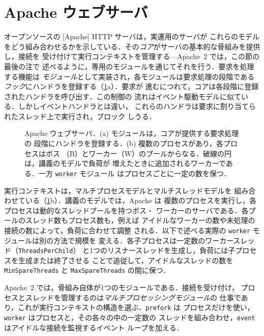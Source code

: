 \documentclass[../main.tex]{subfiles}
\begin{document}
\section{Apache ウェブサーバ}
\label{sec:l06-apache}

オープンソースの [Apache] HTTP サーバは，実運用のサーバが
これらのモデルをどう組み合わせるかを示している．その\emph{コア}がサーバの基本的な骨組みを提供し，接続を
受け付けて実行コンテキストを管理する---Apache~2 では，この節の最後の注で
述べるように，専用のモジュールを通じてそれを行う．要求を処理する機能は
\emph{モジュール}として実装され，各モジュールは要求処理の段階である
\emph{フック}にハンドラを登録する（\cref{fig:l06-apache}a）．要求が
進むにつれて，コアは各段階に登録されたハンドラを呼び出す．この制御の
流れはイベント駆動モデルに似ている．しかしイベントハンドラとは違い，
これらのハンドラは要求に割り当てられたスレッド上で実行され，ブロック
しうる．

\begin{figure}[htbp]
  \centering
  
  \caption{Apache ウェブサーバ．(a) モジュールは，コアが提供する要求処理の
    段階にハンドラを登録する．(b) 複数のプロセスがあり，各プロセスはボス
    （B）とワーカー（W）のプールからなる．破線の円は，講義のモデルで負荷が
    増えたときに追加されるワーカーである．一方 \texttt{worker} モジュール
    はプロセスごとに一定の数を保つ．}
  \label{fig:l06-apache}
\end{figure}

実行コンテキストは，マルチプロセスモデルとマルチスレッドモデルを
組み合わせている（\cref{fig:l06-apache}b）．講義のモデルでは，Apache は
複数のプロセスを実行し，各プロセスは動的なスレッドプールを持つボス・
ワーカーのサーバである．各プールのスレッド数もプロセス数も，例えば
アイドルなワーカーの数や未処理の接続の数によって，負荷に合わせて調整
される．以下で述べる実際の \texttt{worker} モジュールは別の方法で規模を
変える．各子プロセスは一定数のワーカースレッド（\texttt{ThreadsPerChild}）
と1つのリスナースレッドを生成し，負荷には子プロセスを生成または終了させる
ことで追従して，アイドルなスレッドの数を \texttt{MinSpareThreads} と
\texttt{MaxSpareThreads} の間に保つ．

\begin{note}
  Apache~2 では，骨組み自体が1つのモジュールである．接続を受け付け，
  プロセスとスレッドを管理するのは\emph{マルチプロセッシングモジュール}の
  仕事であり，これが実行コンテキストの構造を選ぶ．\texttt{prefork} は
  プロセスだけを使い，\texttt{worker} はプロセスと，その各々の中の一定数の
  スレッドを組み合わせ，\texttt{event} はアイドルな接続を監視するイベント
  ループを加える．%
\end{note}
\end{document}
